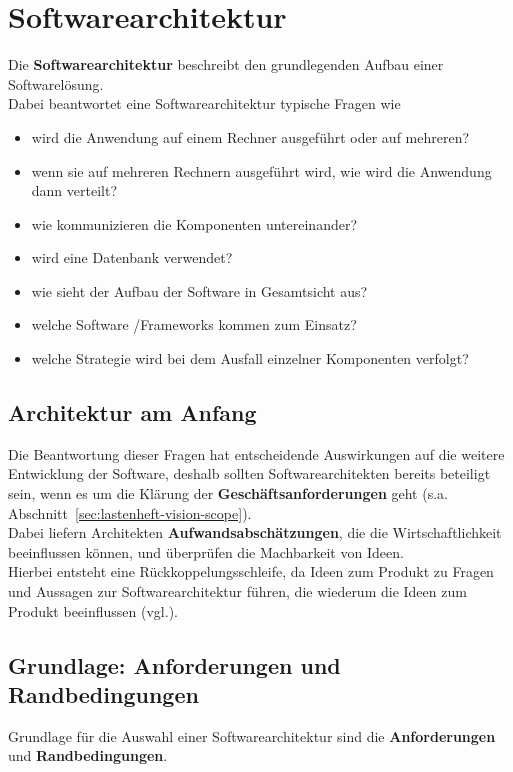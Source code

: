 \section{Softwarearchitektur}\label{sec:softwarearchitektur}

Die \textbf{Softwarearchitektur} beschreibt den grundlegenden Aufbau einer Softwarelösung.\\

\noindent
Dabei beantwortet eine Softwarearchitektur typische Fragen wie

\begin{itemize}
    \item wird die Anwendung auf einem Rechner ausgeführt oder auf mehreren?
    \item wenn sie auf mehreren Rechnern ausgeführt wird, wie wird die Anwendung dann verteilt?
    \item wie kommunizieren die Komponenten untereinander?
    \item wird eine Datenbank verwendet?
    \item wie sieht der Aufbau der Software in Gesamtsicht aus?
    \item welche Software /Frameworks kommen zum Einsatz?
    \item welche Strategie wird bei dem Ausfall einzelner Komponenten verfolgt?
\end{itemize}

\subsection*{Architektur am Anfang}
Die Beantwortung dieser Fragen hat entscheidende Auswirkungen auf die weitere Entwicklung der Software, deshalb sollten Softwarearchitekten bereits beteiligt sein, wenn es um die Klärung der \textbf{Geschäftsanforderungen} geht (s.a. Abschnitt~\ref{sec:lastenheft-vision-scope}).\\

\noindent
Dabei liefern Architekten \textbf{Aufwandsabschätzungen}, die die Wirtschaftlichkeit beeinflussen können, und überprüfen die Machbarkeit von Ideen.\\
Hierbei entsteht eine Rückkoppelungsschleife, da Ideen zum Produkt zu Fragen und Aussagen zur Softwarearchitektur führen, die wiederum die Ideen zum Produkt beeinflussen (vgl.\cite[37]{Wed09b}).

\subsection*{Grundlage: Anforderungen und Randbedingungen}
Grundlage für die Auswahl einer Softwarearchitektur sind die \textbf{Anforderungen} und \textbf{Randbedingungen}.

